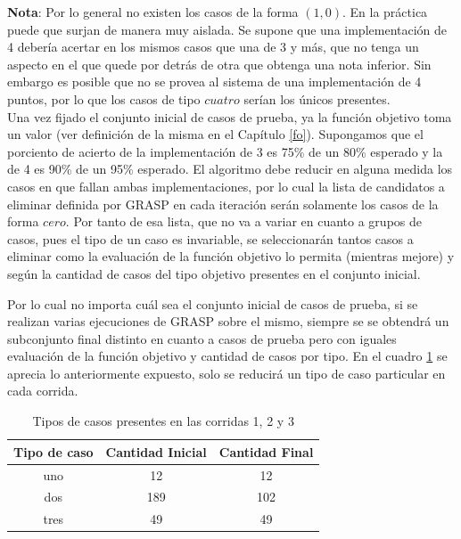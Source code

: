 \documentclass[a4paper,12pt]{book}
\begin{document}
	\textbf{Nota}: Por lo general no existen los casos de la forma $(1, 0)$. En la práctica puede que surjan de manera muy aislada. Se supone que una implementación de 4 debería acertar en los mismos casos que una de 3 y más, que no tenga un aspecto en el que quede por detrás de otra que obtenga una nota inferior. Sin embargo es posible que no se provea al sistema de una implementación de 4 puntos, por lo que los casos de tipo $cuatro$ serían los únicos presentes.\\
 
 	Una vez fijado el conjunto inicial de casos de prueba, ya la función objetivo toma un valor (ver definición de la misma en el Capítulo \ref{fo}). Supongamos que el porciento de acierto de la implementación de 3 es 75\% de un 80\% esperado y la de 4 es 90\% de un 95\% esperado. El algoritmo debe reducir en alguna medida los casos en que fallan ambas implementaciones, por lo cual la lista de candidatos a eliminar definida por GRASP en cada iteración serán solamente los casos de la forma $cero$. Por tanto de esa lista, que no va a variar en cuanto a grupos de casos, pues el tipo de un caso es invariable, se seleccionarán tantos casos a eliminar como la evaluación de la función objetivo lo permita (mientras mejore) y según la cantidad de casos del tipo objetivo presentes en el conjunto inicial.
 	
 	Por lo cual no importa cuál sea el conjunto inicial de casos de prueba, si se realizan varias ejecuciones de GRASP sobre el mismo, siempre se se obtendrá un subconjunto final distinto en cuanto a casos de prueba pero con iguales evaluación de la función objetivo y cantidad de casos por tipo. En el cuadro \ref{tab:Tiposdecasos123} se aprecia lo anteriormente expuesto, solo se reducirá un tipo de caso particular en cada corrida. \\
 	
 	\begin{table}[h]
 		\begin{center}
 			\begin{tabular}{| c | c | c |} \hline
 				Tipo de caso & Cantidad Inicial & Cantidad Final \\ \hline
 				uno & 12 & 12 \\
 				dos & 189 & 102 \\
 				tres & 49 & 49 \\ \hline
 			\end{tabular}
 			\caption{Tipos de casos presentes en las corridas 1, 2 y 3}
 			\label{tab:Tiposdecasos123}
 		\end{center}
 	\end{table}
 
\end{document}
